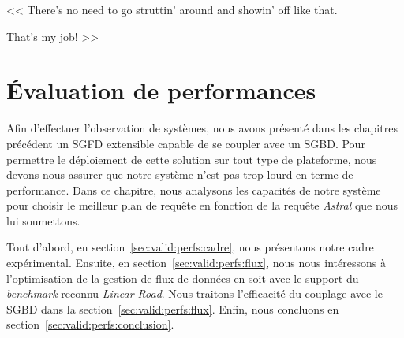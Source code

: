 \begin{savequote}[6cm]
<< There's no need to go struttin' around and showin' off like that. 

\quad That's my job! >>
\end{savequote}

\chapter{Évaluation de performances}\label{chap:valid:perfs}
\chaptertoc

Afin d'effectuer l'observation de systèmes, nous avons présenté dans les chapitres précédent un SGFD extensible capable de se coupler avec un SGBD. Pour permettre le déploiement de cette solution sur tout type de plateforme, nous devons nous assurer que notre système n'est pas trop lourd en terme de performance. Dans ce chapitre, nous analysons les capacités de notre système pour choisir le meilleur plan de requête en fonction de la requête \textit{Astral} que nous lui soumettons.

Tout d'abord, en section~\ref{sec:valid:perfs:cadre}, nous présentons notre cadre expérimental. Ensuite, en section~\ref{sec:valid:perfs:flux}, nous nous intéressons à l'optimisation de la gestion de flux de données en soit avec le support du \textit{benchmark} reconnu \textit{Linear Road}. Nous traitons l'efficacité du couplage avec le SGBD dans la section~\ref{sec:valid:perfs:flux}. Enfin, nous concluons en section~\ref{sec:valid:perfs:conclusion}.





